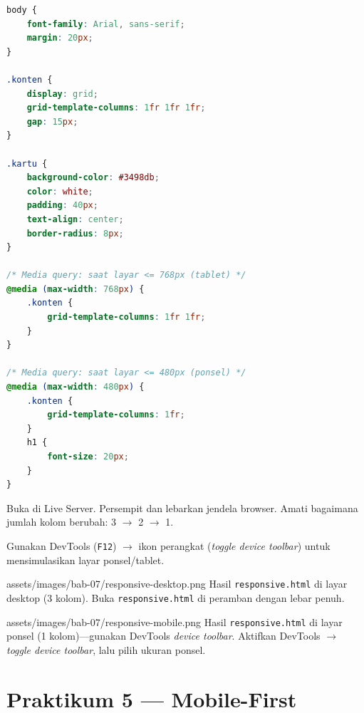 \begin{lstlisting}[language=CSS, caption={Grid responsif dengan media query}, label={lst:responsive-css}]
body {
    font-family: Arial, sans-serif;
    margin: 20px;
}

.konten {
    display: grid;
    grid-template-columns: 1fr 1fr 1fr;
    gap: 15px;
}

.kartu {
    background-color: #3498db;
    color: white;
    padding: 40px;
    text-align: center;
    border-radius: 8px;
}

/* Media query: saat layar <= 768px (tablet) */
@media (max-width: 768px) {
    .konten {
        grid-template-columns: 1fr 1fr;
    }
}

/* Media query: saat layar <= 480px (ponsel) */
@media (max-width: 480px) {
    .konten {
        grid-template-columns: 1fr;
    }
    h1 {
        font-size: 20px;
    }
}
\end{lstlisting}

\begin{langkah}
  \item Buka di Live Server. Persempit dan lebarkan jendela browser. Amati bagaimana jumlah kolom berubah: 3 $\rightarrow$ 2 $\rightarrow$ 1.
\end{langkah}

\begin{tip}
Gunakan DevTools (\texttt{F12}) $\rightarrow$ ikon perangkat (\emph{toggle device toolbar}) untuk mensimulasikan layar ponsel/tablet.
\end{tip}

\begin{tangkapanlayar}
  {assets/images/bab-07/responsive-desktop.png}
  {Hasil \texttt{responsive.html} di layar desktop (3 kolom).}
  {Buka \texttt{responsive.html} di peramban dengan lebar penuh.}
\end{tangkapanlayar}

\begin{tangkapanlayar}
  {assets/images/bab-07/responsive-mobile.png}
  {Hasil \texttt{responsive.html} di layar ponsel (1 kolom)---gunakan DevTools \emph{device toolbar}.}
  {Aktifkan DevTools $\rightarrow$ \emph{toggle device toolbar}, lalu pilih ukuran ponsel.}
\end{tangkapanlayar}

\section{Praktikum 5 --- Mobile-First}
\label{sec:grid-praktik-5}

